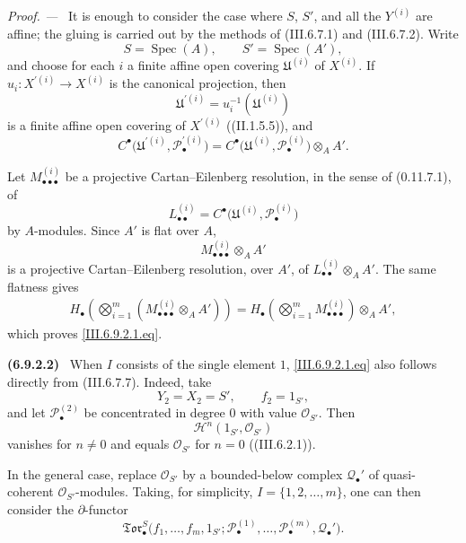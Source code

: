\documentclass[10pt,oneside]{book}
\newcommand{\sh}[1]{\mathscr{#1}}
\newcommand{\Spec}{\operatorname{Spec}}
\newcommand{\sref}[2][]{(#2)}
\newenvironment{env}[1][]{\par\medskip\noindent\textbf{(#1)}\ }{\par}
\newenvironment{proof}{\par\medskip\noindent\textit{Proof. ---\ }}{\par}
\begin{document}
\begin{proof}
It is enough to consider the case where $S$, $S'$, and all the
$Y^{(i)}$ are affine; the gluing is carried out by the methods of
\sref{III.6.7.1} and \sref{III.6.7.2}.  Write
\[
  S=\Spec(A),
  \qquad
  S'=\Spec(A'),
\]
and choose for each $i$ a finite affine open covering
$\mathfrak U^{(i)}$ of $X^{(i)}$.  If
$u_i:X^{\prime(i)}\to X^{(i)}$ is the canonical projection, then
\[
  \mathfrak U^{\prime(i)}
  =
  u_i^{-1}(\mathfrak U^{(i)})
\]
is a finite affine open covering of $X^{\prime(i)}$
(\sref[II]{II.1.5.5}), and
\[
  C^\bullet
  \bigl(
    \mathfrak U^{\prime(i)},\sh P_\bullet^{\prime(i)}
  \bigr)
  =
  C^\bullet
  \bigl(
    \mathfrak U^{(i)},\sh P_\bullet^{(i)}
  \bigr)
  \otimes_AA'.
\]

Let $M_{\bullet\bullet\bullet}^{(i)}$ be a projective
Cartan--Eilenberg resolution, in the sense of
\sref[0]{0.11.7.1}, of
\[
  L_{\bullet\bullet}^{(i)}
  =
  C^\bullet
  \bigl(
    \mathfrak U^{(i)},\sh P_\bullet^{(i)}
  \bigr)
\]
by $A$-modules.  Since $A'$ is flat over $A$,
\[
  M_{\bullet\bullet\bullet}^{(i)}\otimes_AA'
\]
is a projective Cartan--Eilenberg resolution, over $A'$, of
$L_{\bullet\bullet}^{(i)}\otimes_AA'$.  The same flatness gives
\[
\begin{split}
  H_\bullet
  \left(
    \bigotimes_{i=1}^{m}
    (M_{\bullet\bullet\bullet}^{(i)}\otimes_AA')
  \right)
  =
  H_\bullet
  \left(
    \bigotimes_{i=1}^{m}
    M_{\bullet\bullet\bullet}^{(i)}
  \right)
  \otimes_AA',
\end{split}
\]
which proves \eqref{III.6.9.2.1.eq}.
\end{proof}

\begin{env}[6.9.2.2]
\label{III.6.9.2.2}
When $I$ consists of the single element $1$,
\eqref{III.6.9.2.1.eq} also follows directly from
\sref{III.6.7.7}.  Indeed, take
\[
  Y_2=X_2=S',
  \qquad
  f_2=1_{S'},
\]
and let $\sh P_\bullet^{(2)}$ be concentrated in degree $0$ with
value $\sh O_{S'}$.  Then
\[
  \sh H^n(1_{S'},\sh O_{S'})
\]
vanishes for $n\neq0$ and equals $\sh O_{S'}$ for $n=0$
(\sref{III.6.2.1}).
\end{env}

In the general case, replace $\sh O_{S'}$ by a bounded-below
complex $\sh Q_\bullet'$ of quasi-coherent
$\sh O_{S'}$-modules.  Taking, for simplicity,
$I=\{1,2,\ldots,m\}$, one can then consider the
$\partial$-functor
\[
  \mathfrak{Tor}_\bullet^S
  \bigl(
    f_1,\ldots,f_m,1_{S'};
    \sh P_\bullet^{(1)},\ldots,\sh P_\bullet^{(m)},
    \sh Q_\bullet'
  \bigr).
\]
\end{document}
